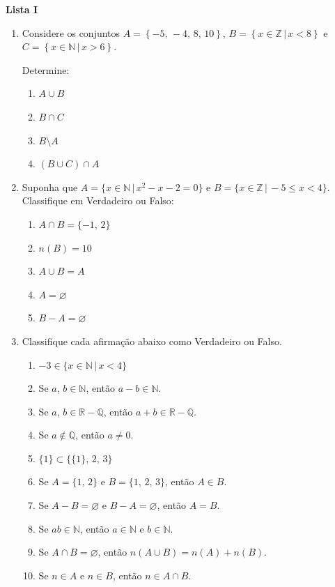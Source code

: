 \documentclass[12pt,a4paper]{article}
\begin{document}
\begin{center}
  \textbf{Lista I}
\end{center}

\begin{enumerate}
  \item Considere os conjuntos $A = \left\{-5,\,-4,\,8,\,10\right\}$,
    $B = \left\{x\in\mathbb{Z} \,|\, x < 8\right\}$ e
    $C = \left\{x\in\mathbb{N} \,|\, x > 6\right\}$.

    Determine:
    \begin{enumerate}
      \item $A\cup B$
      \item $B\cap C$
      \item $B\setminus A$
      \item $(B\cup C)\cap A$
    \end{enumerate}

  \item Suponha que $A = \{x\in\mathbb{N} \,|\, x^2 - x - 2 = 0\}$ e 
    $B = \{x\in\mathbb{Z} \,|\, -5 \leq x < 4 \}$. Classifique em Verdadeiro ou
    Falso:

    \begin{enumerate}[(\ \ )]
      \item $A\cap B = \{-1,\,2\}$
      \item $n(B) = 10$
      \item $A\cup B = A$
      \item $A=\varnothing$
      \item $B - A=\varnothing$
    \end{enumerate}

  \item Classifique cada afirmação abaixo como Verdadeiro ou Falso.

    \begin{enumerate}[(\ \ )]
      \item $-3 \in \{x\in \mathbb{N} \,|\, x < 4\}$
      \item Se $a$, $b\in\mathbb{N}$, então $a - b \in\mathbb{N}$.
      \item Se $a$, $b\in\mathbb{R} - \mathbb{Q}$, então 
        $a + b \in\mathbb{R} - \mathbb{Q}$.
      \item Se $a\notin \mathbb{Q}$, então $a\neq 0$.
      \item $\{1\} \subset \{\{1\},\,2,\,3\}$
      \item Se $A = \{1,\,2\}$ e $B = \{1,\,2,\,3\}$, então $A\in B$.
      \item Se $A - B = \varnothing$ e $B - A = \varnothing$, então $A = B$.
      \item Se $ab \in \mathbb{N}$, então $a \in \mathbb{N}$ e $b \in \mathbb{N}$.
      \item Se $A\cap B = \varnothing$, então $n(A\cup B) = n(A) + n(B)$.
      \item Se $n\in A$ e $n\in B$, então $n\in A\cap B$.
    \end{enumerate}


\end{enumerate}
\end{document}
